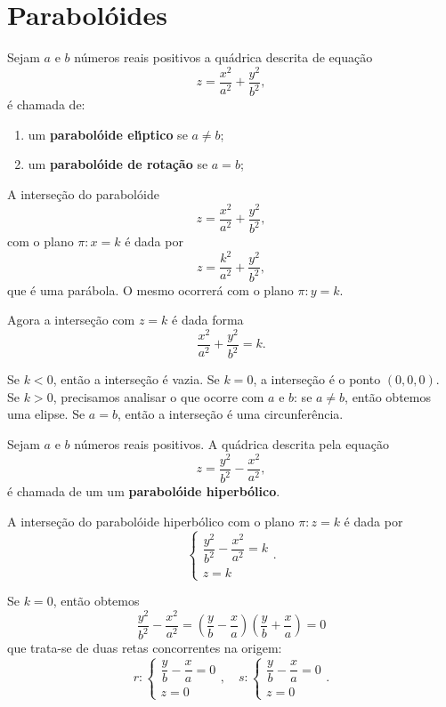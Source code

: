 \section{Parabol\'oides} %
\label{sec:paraboloide}
\begin{definicao}
	Sejam $a$ e $b$ n\'umeros reais positivos a qu\'adrica descrita de equa\c{c}\~ao
	\[
		z = \dfrac{x^2}{a^2} + \dfrac{y^2}{b^2},
	\]
	\'e chamada de:
	\begin{enumerate}
		\item um \textbf{parabol\'oide el{\'\i}ptico} se $a \ne b$;
		\item um \textbf{parabol\'oide de rota\c{c}\~ao} se $a = b$;
	\end{enumerate}
\end{definicao}

A interse\c{c}\~ao do parabol\'oide
\[
	z = \dfrac{x^2}{a^2} + \dfrac{y^2}{b^2},
\]
com o plano $\pi: x = k$ \'e dada por
\[
	z = \dfrac{k^2}{a^2} + \dfrac{y^2}{b^2},
\]
que \'e uma par\'abola. O mesmo ocorrer\'a com o plano $\pi: y = k$.

Agora a interse\c{c}\~ao com $z = k$ \'e dada forma
\[
	\dfrac{x^2}{a^2} + \dfrac{y^2}{b^2} = k.
\]

Se $k < 0$, ent\~ao a interse\c{c}\~ao \'e vazia. Se $k = 0$, a interse\c{c}\~ao \'e o ponto $(0,0,0)$. Se $k > 0$, precisamos analisar o que ocorre com $a$ e $b$: se $a \ne b$, ent\~ao obtemos uma elipse. Se $a = b$, ent\~ao a interse\c{c}\~ao \'e uma circunfer\^encia.

\begin{definicao}
	Sejam $a$ e $b$ n\'umeros reais positivos. A qu\'adrica descrita pela equa\c{c}\~ao
	\[
		z = \dfrac{y^2}{b^2} - \dfrac{x^2}{a^2},
	\]
	\'e chamada de um um \textbf{parabol\'oide hiperb\'olico}.
\end{definicao}

A interse\c{c}\~ao do parabol\'oide hiperb\'olico com o plano $\pi : z = k$ \'e dada por
\[
	\begin{cases}
		\dfrac{y^2}{b^2} - \dfrac{x^2}{a^2} = k\\
		z = k
	\end{cases}.
\]

Se $k = 0$, ent\~ao obtemos
\[
	\dfrac{y^2}{b^2} - \dfrac{x^2}{a^2} = \left(\dfrac{y}{b} - \dfrac{x}{a}\right)\left(\dfrac{y}{b} + \dfrac{x}{a}\right) = 0
\]
que trata-se de duas retas concorrentes na origem:
\[
	r : \begin{cases}
		\dfrac{y}{b} - \dfrac{x}{a} = 0\\
		z = 0
	\end{cases}, \quad s : \begin{cases}
		\dfrac{y}{b} - \dfrac{x}{a} = 0\\
		z = 0
	\end{cases}.
\]

